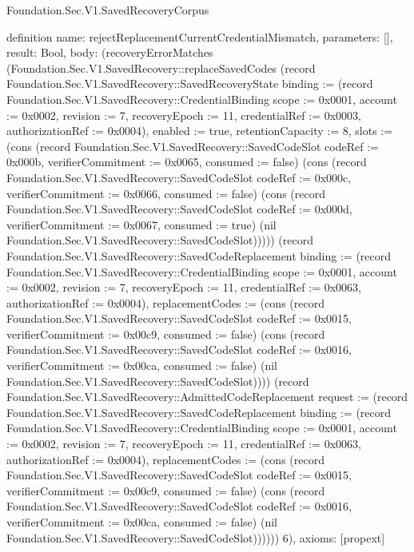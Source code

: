 \begin{lexlean}{Foundation.Sec.V1.SavedRecoveryCorpus}
\begin{semanticmodule}
definition{
  name: rejectReplacementCurrentCredentialMismatch,
  parameters: [],
  result: Bool,
  body: (recoveryErrorMatches (Foundation.Sec.V1.SavedRecovery::replaceSavedCodes (record Foundation.Sec.V1.SavedRecovery::SavedRecoveryState {binding := (record Foundation.Sec.V1.SavedRecovery::CredentialBinding {scope := 0x0001, account := 0x0002, revision := 7, recoveryEpoch := 11, credentialRef := 0x0003, authorizationRef := 0x0004}), enabled := true, retentionCapacity := 8, slots := (cons (record Foundation.Sec.V1.SavedRecovery::SavedCodeSlot {codeRef := 0x000b, verifierCommitment := 0x0065, consumed := false}) (cons (record Foundation.Sec.V1.SavedRecovery::SavedCodeSlot {codeRef := 0x000c, verifierCommitment := 0x0066, consumed := false}) (cons (record Foundation.Sec.V1.SavedRecovery::SavedCodeSlot {codeRef := 0x000d, verifierCommitment := 0x0067, consumed := true}) (nil Foundation.Sec.V1.SavedRecovery::SavedCodeSlot))))}) (record Foundation.Sec.V1.SavedRecovery::SavedCodeReplacement {binding := (record Foundation.Sec.V1.SavedRecovery::CredentialBinding {scope := 0x0001, account := 0x0002, revision := 7, recoveryEpoch := 11, credentialRef := 0x0063, authorizationRef := 0x0004}), replacementCodes := (cons (record Foundation.Sec.V1.SavedRecovery::SavedCodeSlot {codeRef := 0x0015, verifierCommitment := 0x00c9, consumed := false}) (cons (record Foundation.Sec.V1.SavedRecovery::SavedCodeSlot {codeRef := 0x0016, verifierCommitment := 0x00ca, consumed := false}) (nil Foundation.Sec.V1.SavedRecovery::SavedCodeSlot)))}) (record Foundation.Sec.V1.SavedRecovery::AdmittedCodeReplacement {request := (record Foundation.Sec.V1.SavedRecovery::SavedCodeReplacement {binding := (record Foundation.Sec.V1.SavedRecovery::CredentialBinding {scope := 0x0001, account := 0x0002, revision := 7, recoveryEpoch := 11, credentialRef := 0x0063, authorizationRef := 0x0004}), replacementCodes := (cons (record Foundation.Sec.V1.SavedRecovery::SavedCodeSlot {codeRef := 0x0015, verifierCommitment := 0x00c9, consumed := false}) (cons (record Foundation.Sec.V1.SavedRecovery::SavedCodeSlot {codeRef := 0x0016, verifierCommitment := 0x00ca, consumed := false}) (nil Foundation.Sec.V1.SavedRecovery::SavedCodeSlot)))})})) 6),
  axioms: [propext]
}


\end{semanticmodule}
\end{lexlean}
